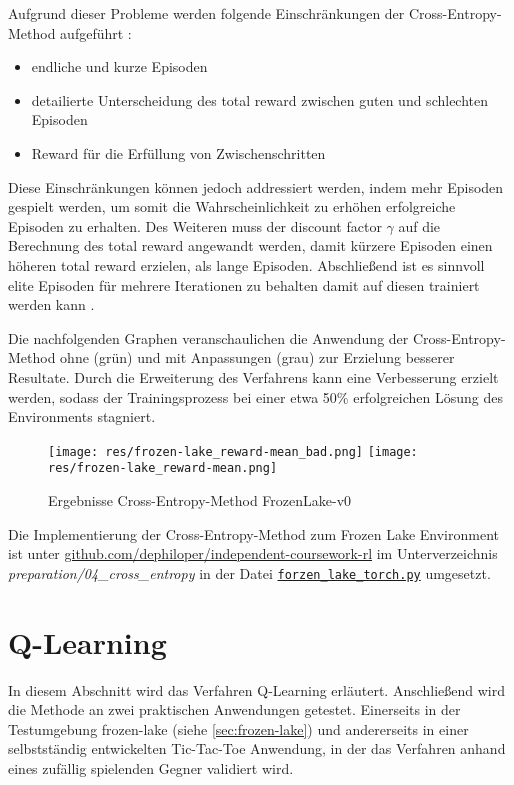 \documentclass[11pt]{scrartcl}
\begin{document}
Aufgrund dieser Probleme werden folgende Einschränkungen der Cross-Entropy-Method 
aufgeführt \cite[~S.92 f.]{L2018}:
\begin{itemize}
\itemsep0pt
\item endliche und kurze Episoden
\item detailierte Unterscheidung des total reward zwischen guten und schlechten Episoden
\item Reward für die Erfüllung von Zwischenschritten
\end{itemize}

Diese Einschränkungen können jedoch addressiert werden, indem mehr Episoden gespielt werden, 
um somit die Wahrscheinlichkeit zu erhöhen erfolgreiche Episoden zu erhalten. Des Weiteren
muss der discount factor $\gamma$ auf die Berechnung des total reward angewandt werden, damit
kürzere Episoden einen höheren total reward erzielen, als lange Episoden. Abschließend ist es
sinnvoll elite Episoden für mehrere Iterationen zu behalten damit auf diesen trainiert werden
kann \cite[~S.93]{L2018}.  

Die nachfolgenden Graphen veranschaulichen die Anwendung der Cross-Entropy-Method ohne (grün)
und mit Anpassungen (grau) zur Erzielung besserer Resultate. Durch die Erweiterung des
Verfahrens kann eine Verbesserung erzielt werden, sodass der Trainingsprozess bei einer
etwa 50\% erfolgreichen Lösung des Environments stagniert.

\begin{figure}[htp]
\centering
\texttt{[image: res/frozen-lake\_reward-mean\_bad.png]}
\texttt{[image: res/frozen-lake\_reward-mean.png]}
\caption{Ergebnisse Cross-Entropy-Method FrozenLake-v0}
\label{fig:frozen-lake_cross-entropy}
\end{figure}

Die Implementierung der Cross-Entropy-Method zum Frozen Lake Environment ist unter
\url{github.com/dephiloper/independent-coursework-rl} im Unterverzeichnis 
\textit{preparation/04\_cross\_entropy} in der Datei 
\href{https://github.com/dephiloper/independent-coursework-rl/blob/master/preparation/04_cross_entropy/frozen_lake_torch.py}{\nolinkurl{forzen\_lake\_torch.py}} umgesetzt.
\newpage


\section{Q-Learning}
In diesem Abschnitt wird das Verfahren Q-Learning erläutert. Anschließend wird die Methode
an zwei praktischen Anwendungen getestet. Einerseits in der Testumgebung frozen-lake 
(siehe \autoref{sec:frozen-lake}) und andererseits in einer selbstständig entwickelten
Tic-Tac-Toe Anwendung, in der das Verfahren anhand eines zufällig spielenden Gegner
validiert wird.
\end{document}
